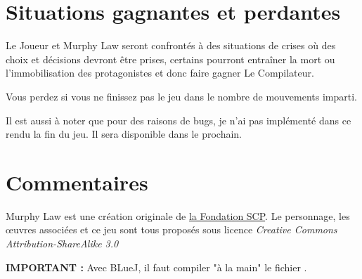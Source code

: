 \section{Situations gagnantes et perdantes}

Le Joueur et Murphy Law seront confrontés à des situations de crises où des choix et décisions devront être prises, certains pourront entraîner la mort ou l'immobilisation des protagonistes et donc faire gagner Le Compilateur.

Vous perdez si vous ne finissez pas le jeu dans le nombre de mouvements imparti.

Il est aussi à noter que pour des raisons de bugs, je n'ai pas implémenté dans ce rendu la fin du jeu. Il sera disponible dans le prochain.

\section{Commentaires}

Murphy Law est une création originale de \href{http://scp-wiki.wikidot.com/murphy-law-hub}{la Fondation SCP}. Le personnage, les œuvres associées et ce jeu sont tous proposés sous licence \emph{Creative Commons Attribution-ShareAlike 3.0}

\textbf{IMPORTANT :} Avec BLueJ, il faut compiler "à la main" le fichier .
 
